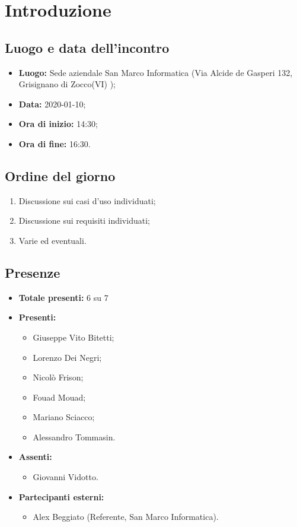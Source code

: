 \section*{Introduzione}

\subsection*{Luogo e data dell'incontro}
	\begin{itemize}
		\item \textbf{Luogo:} Sede aziendale San Marco Informatica (Via Alcide de Gasperi 132, Grisignano di Zocco(VI) );
		\item \textbf{Data:} 2020-01-10;
		\item \textbf{Ora di inizio:} 14:30;
		\item \textbf{Ora di fine:} 16:30.
	\end{itemize}

\subsection*{Ordine del giorno}
	\begin{enumerate}
		\item Discussione sui casi d'uso individuati;
		\item Discussione sui requisiti individuati;
		\item Varie ed eventuali.
	\end{enumerate}

\subsection*{Presenze}
	\begin{itemize}
		\item \textbf{Totale presenti:} 6 su 7
		\item \textbf{Presenti: }
			\begin{itemize}			
				\item Giuseppe Vito Bitetti;
				\item Lorenzo Dei Negri;
				\item Nicolò Frison;
				\item Fouad Mouad;
				\item Mariano Sciacco;
				\item Alessandro Tommasin.
			\end{itemize}
		\item \textbf{Assenti: } 
			\begin{itemize}	
				\item Giovanni Vidotto.
			\end{itemize}
		\item \textbf{Partecipanti esterni:}
			\begin{itemize}
				\item Alex Beggiato (Referente, San Marco Informatica).
			\end{itemize}
	\end{itemize}


